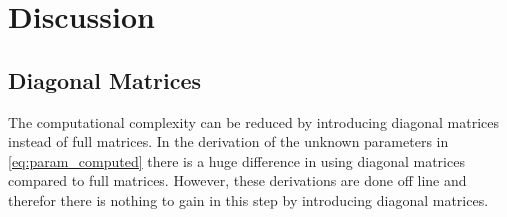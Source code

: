 \chapter{Discussion} %
\label{cha:discussion}

\section{Diagonal Matrices} %
\label{sec:diagonal_matrices}
The computational complexity can be reduced by introducing diagonal matrices instead of full matrices. In the derivation of the unknown parameters in \eqref{eq:param_computed} there is a huge difference in using diagonal matrices compared to full matrices. However, these derivations are done off line and therefor there is nothing to gain in this step by introducing diagonal matrices.

% 
% 

